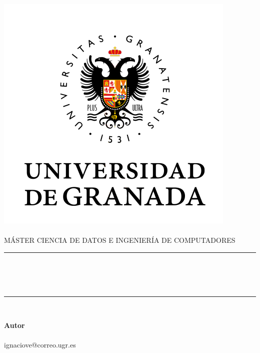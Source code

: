 \begin{titlepage}
    \begin{minipage}{\textwidth}
        \centering

        \includegraphics[scale=0.5]{img/ugr.png}\\

        \textsc{\Large \asignatura{}\\[0.2cm]}
        \textsc{MÁSTER CIENCIA DE DATOS E INGENIERÍA DE COMPUTADORES}\\[1cm]

        \noindent\rule[-1ex]{\textwidth}{1pt}\\[1.5ex]
        \textsc{{\Huge \titulo\\[0.5ex]}}
        \textsc{{\Large \subtitulo\\}}
        \noindent\rule[-1ex]{\textwidth}{2pt}\\[2.5ex]

        \end{minipage}

        \vspace{0.3cm}

        \begin{minipage}{\textwidth}

        \centering

        \textbf{Autor}\\ {\autor{} \\ ignaciove@correo.ugr.es}\\[1.5ex]
        \vspace{0.4cm}


\end{minipage}
\end{titlepage}

